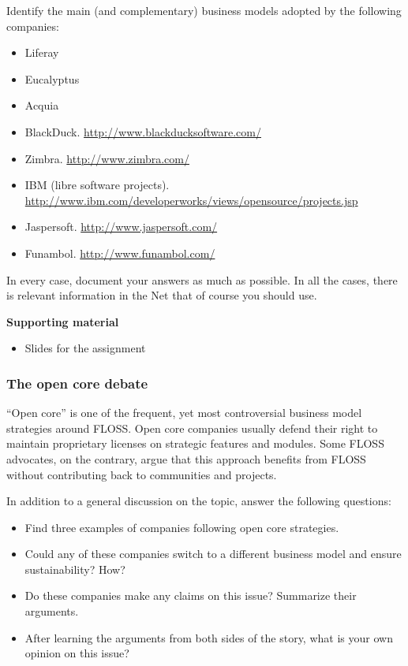 \documentclass[a4paper]{article}
\begin{document}
Identify the main (and complementary) business models adopted by the following companies:

\begin{itemize}
\item Liferay
\item Eucalyptus
\item Acquia
\item BlackDuck.
   \url{http://www.blackducksoftware.com/}
 \item Zimbra.
   \url{http://www.zimbra.com/}
 \item IBM (libre software projects).
   \footnotesize{\url{http://www.ibm.com/developerworks/views/opensource/projects.jsp}}
 \item Jaspersoft.
   \url{http://www.jaspersoft.com/}
 \item Funambol.
   \url{http://www.funambol.com/}
\end{itemize}

In every case, document your answers as much as possible. In all the cases, there is relevant information in the Net that of course you should use.

\textbf{Supporting material}

\begin{itemize}
\item Slides for the assignment
\end{itemize}

\subsubsection{The open core debate}
\label{sub:business-opencore}

``Open core'' is one of the frequent, yet most controversial business model strategies around FLOSS. Open core companies usually defend their right to maintain proprietary licenses on strategic features and modules. Some FLOSS advocates, on the contrary, argue that this approach benefits from FLOSS without contributing back to communities and projects.

In addition to a general discussion on the topic, answer the following questions:

\begin{itemize}
\item Find three examples of companies following open core strategies.
\item Could any of these companies switch to a different business model
  and ensure sustainability? How?
\item Do these companies make any claims on this issue? Summarize
  their arguments.
\item After learning the arguments from both sides of the story, what is your
  own opinion on this issue?
\end{itemize}
\end{document}

